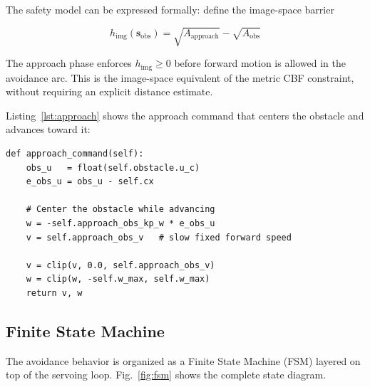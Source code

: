 \documentclass[journal, 10pt]{IEEEtran}
\begin{document}
The safety model can be expressed formally: define the image-space barrier

\begin{equation}
  h_{\text{img}}(\mathbf{s}_{\text{obs}}) =
  \sqrt{A_{\text{approach}}} - \sqrt{A_{\text{obs}}}
  \label{eq:imgbarrier}
\end{equation}

The approach phase enforces $h_{\text{img}} \geq 0$ before forward motion
is allowed in the avoidance arc. This is the image-space equivalent of the
metric CBF constraint, without requiring an explicit distance estimate.

Listing~\ref{lst:approach} shows the approach command that centers the
obstacle and advances toward it:

\begin{lstlisting}[caption={Approach command toward obstacle.},
                   label={lst:approach}]
def approach_command(self):
    obs_u   = float(self.obstacle.u_c)
    e_obs_u = obs_u - self.cx

    # Center the obstacle while advancing
    w = -self.approach_obs_kp_w * e_obs_u
    v = self.approach_obs_v   # slow fixed forward speed

    v = clip(v, 0.0, self.approach_obs_v)
    w = clip(w, -self.w_max, self.w_max)
    return v, w
\end{lstlisting}

\subsection{Finite State Machine}

The avoidance behavior is organized as a Finite State Machine (FSM) layered
on top of the servoing loop. Fig.~\ref{fig:fsm} shows the complete state
diagram.
\end{document}
